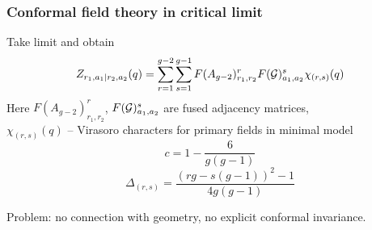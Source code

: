 \documentclass[pdftex]{beamer}
\theoremstyle{definition} \newtheorem{Def}{Definition}
\begin{document}
\begin{frame}
  \frametitle{ Conformal field theory in critical limit }
  Take limit and obtain
  \begin{equation}
    \label{eq:10}
    Z_{r_1,a_1|r_2,a_2}(q) = \sum_{r=1}^{g-2} \sum_{s=1}^{g-1} F(A_{g-2})_{r_1,r_2}^r F({\cal G})_{a_1,a_2}^s \chi_{(r,s)}(q)
  \end{equation}
  Here $F(A_{g-2})_{r_1,r_2}^r$, $F({\cal G})_{a_1,a_2}^s$ are fused adjacency matrices,\\ $\chi_{(r,s)}(q)$ -- Virasoro characters for primary fields in minimal model
  \begin{equation}
    \label{eq:11}
    c=1-\frac{6}{g(g-1)}
  \end{equation}
  \begin{equation}
    \label{eq:13}
    \Delta_{(r,s)}=\frac{(rg-s(g-1))^2-1}{4g(g-1)}
  \end{equation}

  Problem: no connection with geometry, no explicit conformal invariance.
\end{frame}
\end{document}

